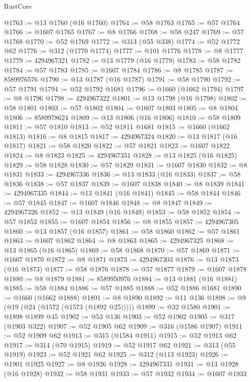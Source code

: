\begin{lexlean}{RustCore}
\begin{coremodule}
@1763 := @13 @1760 (@16 @1760)
@1764 := @58 @1763
@1765 := @57 @1764
@1766 := @1607 @1765
@1767 := @8 @1766
@1768 := @58 @247
@1769 := @57 @1768
@1770 := @52 @1769
@1772 := @313 (@55 @338)
@1774 := @52 @1772 @62
@1776 := @312 (@1770 @1774)
@1777 := @101 @1776
@1778 := @8 @1777
@1779 := 4294967321
@1782 := @13 @1779 (@16 @1779)
@1783 := @58 @1782
@1784 := @57 @1783
@1785 := @1607 @1784
@1786 := @8 @1785
@1787 := 8589976576
@1790 := @13 @1787 (@16 @1787)
@1791 := @58 @1790
@1792 := @57 @1791
@1794 := @52 @1792 @1681
@1796 := @1660 (@1662 @1794)
@1797 := @8 @1796
@1798 := 4294967322
@1801 := @13 @1798 (@16 @1798)
@1802 := @58 @1801
@1803 := @57 @1802
@1804 := @1607 @1803
@1805 := @8 @1804
@1806 := 8589978624
@1809 := @13 @1806 (@16 @1806)
@1810 := @58 @1809
@1811 := @57 @1810
@1813 := @52 @1811 @1681
@1815 := @1660 (@1662 @1813)
@1816 := @8 @1815
@1817 := 4294967324
@1820 := @13 @1817 (@16 @1817)
@1821 := @58 @1820
@1822 := @57 @1821
@1823 := @1607 @1822
@1824 := @8 @1823
@1825 := 4294967351
@1828 := @13 @1825 (@16 @1825)
@1829 := @58 @1828
@1830 := @57 @1829
@1831 := @1607 @1830
@1832 := @8 @1831
@1833 := 4294967336
@1836 := @13 @1833 (@16 @1833)
@1837 := @58 @1836
@1838 := @57 @1837
@1839 := @1607 @1838
@1840 := @8 @1839
@1841 := 4294967335
@1844 := @13 @1841 (@16 @1841)
@1845 := @58 @1844
@1846 := @57 @1845
@1847 := @1607 @1846
@1848 := @8 @1847
@1849 := 4294967326
@1852 := @13 @1849 (@16 @1849)
@1853 := @58 @1852
@1854 := @57 @1853
@1855 := @1607 @1854
@1856 := @8 @1855
@1857 := 4294967305
@1860 := @13 @1857 (@16 @1857)
@1861 := @58 @1860
@1862 := @57 @1861
@1863 := @1607 @1862
@1864 := @8 @1863
@1865 := 4294967325
@1868 := @13 @1865 (@16 @1865)
@1869 := @58 @1868
@1870 := @57 @1869
@1871 := @1607 @1870
@1872 := @8 @1871
@1873 := 4294967303
@1876 := @13 @1873 (@16 @1873)
@1877 := @58 @1876
@1878 := @57 @1877
@1879 := @1607 @1878
@1880 := @8 @1879
@1881 := 8589950976
@1884 := @13 @1881 (@16 @1881)
@1885 := @58 @1884
@1886 := @57 @1885
@1888 := @52 @1886 @1681
@1890 := @1660 (@1662 @1888)
@1891 := @8 @1890
@1892 := @11 @136
@1898 := @9 (@19 (@24 (@1572 (@1573 (@1892 @25)))))
@1899 := @32 @1580
@1901 := @1898 @1899 @45
@1902 := @53 @136
@1903 := @52 @1902
@1905 := @317 (@1903 @322)
@1907 := @52 @1905 @62
@1909 := @316 (@1586 @1907)
@1911 := @52 @1909 @62
@1913 := @315 (@1584 @1911)
@1915 := @52 @1913 @62
@1917 := @314 (@70 @1915)
@1919 := @52 @1917 @62
@1921 := @313 (@55 @1919)
@1923 := @52 @1921 @62
@1925 := @312 (@113 @1923)
@1926 := @1901 @1925
@1927 := @8 @1926
@1928 := 4294967331
@1931 := @13 @1928 (@16 @1928)
@1932 := @58 @1931
@1933 := @57 @1932
@1934 := @1607 @1933

\end{coremodule}
\end{lexlean}
